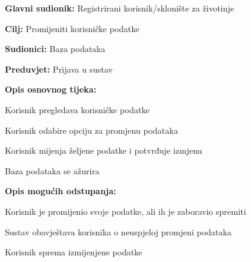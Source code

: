 					\noindent {}
					\begin{packed_item}
	
						\item \textbf{Glavni sudionik:} Registrirani korisnik/sklonište za životinje
						\item  \textbf{Cilj:} Promijeniti korisničke podatke
						\item  \textbf{Sudionici:} Baza podataka
						\item  \textbf{Preduvjet:} Prijava u sustav
						\item  \textbf{Opis osnovnog tijeka:}
						
						\item[] \begin{packed_enum}
	
							\item Korisnik pregledava korisničke podatke
							\item Korisnik odabire opciju za promjenu podataka
							\item Korisnik mijenja željene podatke i potvrđuje izmjenu
							\item Baza podataka se ažurira
						\end{packed_enum}
						
						\item \textbf{Opis mogućih odstupanja:} 
						
						
						\item[] \begin{packed_item}
	
							\item[3.a] Korisnik je promijenio svoje podatke, ali ih je zaboravio spremiti
							\item[] \begin{packed_enum}
								
								\item Sustav obavještava korisnika o neuspjeloj promjeni podataka
								\item Korisnik sprema izmijenjene podatke
								
								\end{packed_enum}
						\end{packed_item}
					\end{packed_item}
					
